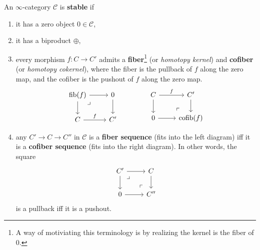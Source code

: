 \begin{definition}[]
    An $\infty$-category $\mathcal{C} $ is \textbf{stable} if
    \begin{enumerate}[label=(\roman*)]
    \setlength\itemsep{-.2em}
        \item it has a zero object $0 \in \mathcal{C} $,
        \item it has a biproduct $\oplus$,
        \item every morphism $f \colon C \to C'$ admits a \textbf{fiber}\footnote{A way of motiviating this terminology is by realizing the kernel is the fiber of 0.} (or \emph{homotopy kernel}) and \textbf{cofiber} (or \emph{homotopy cokernel}), where the fiber is the pullback of $f$ along the zero map, and the cofiber is the pushout of $f$ along the zero map. \[
        \begin{tikzcd}
            \mathrm{fib}(f)\arrow[r]\arrow[d] \arrow[dr,phantom,"\lrcorner",very near start]& 0 \arrow[d]\\
            C \arrow[r,"f"] & C'
        \end{tikzcd}\qquad\qquad     
        \begin{tikzcd}
            C\arrow[r,"f"]\arrow[d] & C' \arrow[d]\\
            0 \arrow[r] & \mathrm{cofib}(f)\arrow[ul,phantom,"\ulcorner", very near start]
        \end{tikzcd}
        \] 
    \item any $C'\to C \to C''$ in $\mathcal C$ is a \textbf{fiber sequence} (fits into the left diagram) iff it is a \textbf{cofiber sequence} (fits into the right diagram). In other words, the square \[
    \begin{tikzcd}
        C'\arrow[r]\arrow[d]\arrow[dr,phantom,"\lrcorner",very near start]& C\arrow[d]\\
        0\arrow[r]& C''\arrow[ul,phantom,"\ulcorner",very near start]
    \end{tikzcd}
    \]is a pullback iff it is a pushout.
    \end{enumerate}
\end{definition}

